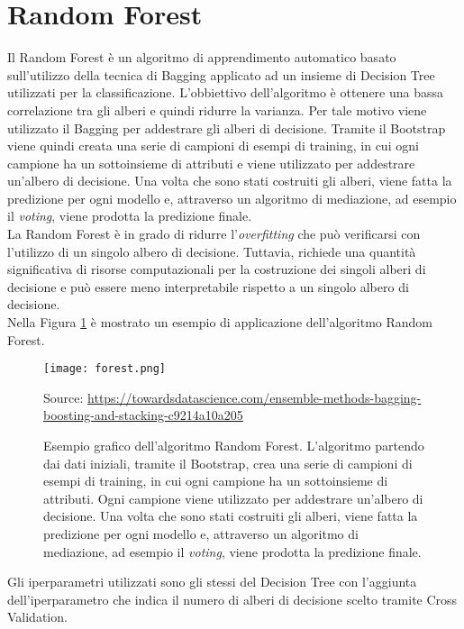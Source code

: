 \section{Random Forest}
Il Random Forest \autocite{ho1995random} è un algoritmo di apprendimento automatico basato sull'utilizzo della tecnica di Bagging applicato ad un insieme di Decision Tree utilizzati per la classificazione. L'obbiettivo dell'algoritmo è ottenere una bassa correlazione tra gli alberi e quindi ridurre la varianza. Per tale motivo viene utilizzato il Bagging per addestrare gli alberi di decisione. Tramite il Bootstrap viene quindi creata una serie di campioni di esempi di training, in cui ogni campione ha un sottoinsieme di attributi e viene utilizzato per addestrare un'albero di decisione. Una volta che sono stati costruiti gli alberi, viene fatta la predizione per ogni modello e, attraverso un algoritmo di mediazione, ad esempio il \emph{voting}, viene prodotta la predizione finale.\\
La Random Forest è in grado di ridurre l'\emph{overfitting} che può verificarsi con l'utilizzo di un singolo albero di decisione. Tuttavia, richiede una quantità significativa di risorse computazionali per la costruzione dei singoli alberi di decisione e può essere meno interpretabile rispetto a un singolo albero di decisione.\\
Nella Figura \ref{fig:forest} è mostrato un esempio di applicazione dell'algoritmo Random Forest.
\begin{figure}[h]
	\begin{center}
		\texttt{[image: forest.png]}
		\caption{Esempio grafico dell'algoritmo Random Forest. L'algoritmo partendo dai dati iniziali, tramite il Bootstrap, crea una serie di campioni di esempi di training, in cui ogni campione ha un sottoinsieme di attributi. Ogni campione viene utilizzato per addestrare un'albero di decisione. Una volta che sono stati costruiti gli alberi, viene fatta la predizione per ogni modello e, attraverso un algoritmo di mediazione, ad esempio il \emph{voting}, viene prodotta la predizione finale.
		} 
		Source: \url{https://towardsdatascience.com/ensemble-methods-bagging-boosting-and-stacking-c9214a10a205}\label{fig:forest}
	\end{center}
\end{figure}
Gli iperparametri utilizzati sono gli stessi del Decision Tree con l'aggiunta dell'iperparametro che indica il numero di alberi di decisione scelto tramite Cross Validation.
